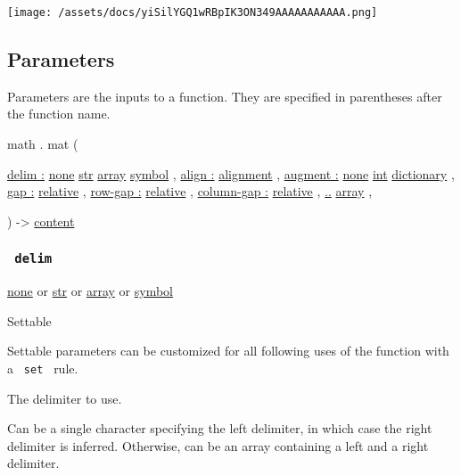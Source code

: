 \texttt{[image: /assets/docs/yiSilYGQ1wRBpIK3ON349AAAAAAAAAAA.png]}

\subsection{\texorpdfstring{{ Parameters
}}{ Parameters }}\label{parameters}

\label{parameters-tooltip}
Parameters are the inputs to a function. They are specified in
parentheses after the function name.

math { . } { mat } (

{ \hyperref[parameters-delim]{delim :}
\href{/docs/reference/foundations/none/}{none}
\href{/docs/reference/foundations/str/}{str}
\href{/docs/reference/foundations/array/}{array}
\href{/docs/reference/symbols/symbol/}{symbol} , } {
\hyperref[parameters-align]{align :}
\href{/docs/reference/layout/alignment/}{alignment} , } {
\hyperref[parameters-augment]{augment :}
\href{/docs/reference/foundations/none/}{none}
\href{/docs/reference/foundations/int/}{int}
\href{/docs/reference/foundations/dictionary/}{dictionary} , } {
\hyperref[parameters-gap]{gap :}
\href{/docs/reference/layout/relative/}{relative} , } {
\hyperref[parameters-row-gap]{row-gap :}
\href{/docs/reference/layout/relative/}{relative} , } {
\hyperref[parameters-column-gap]{column-gap :}
\href{/docs/reference/layout/relative/}{relative} , } {
\hyperref[parameters-rows]{..}
\href{/docs/reference/foundations/array/}{array} , }

) -\textgreater{} \href{/docs/reference/foundations/content/}{content}

\subsubsection{\texorpdfstring{\texttt{\ delim\ }}{ delim }}\label{parameters-delim}

\href{/docs/reference/foundations/none/}{none} {or}
\href{/docs/reference/foundations/str/}{str} {or}
\href{/docs/reference/foundations/array/}{array} {or}
\href{/docs/reference/symbols/symbol/}{symbol}

{{ Settable }}

\label{parameters-delim-settable-tooltip}
Settable parameters can be customized for all following uses of the
function with a \texttt{\ set\ } rule.

The delimiter to use.

Can be a single character specifying the left delimiter, in which case
the right delimiter is inferred. Otherwise, can be an array containing a
left and a right delimiter.

